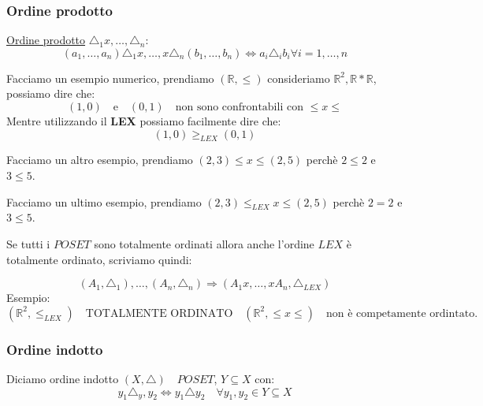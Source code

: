 \documentclass{article}
\begin{document}
\subsubsection{Ordine prodotto}
\underline{Ordine prodotto} $\triangle_1x,\ldots,\triangle_n$:
\begin{equation*}
        (a_1,\ldots,a_n) \triangle_1x,\ldots, x\triangle_n(b_1,\ldots,b_n) \Leftrightarrow a_i \triangle_i b_i \forall i = 1,\ldots,n
\end{equation*}

Facciamo un esempio numerico, prendiamo $(\mathbb{R}, \le)$ consideriamo $\mathbb{R}^2, \mathbb{R}*\mathbb{R}$, possiamo dire che:
\begin{equation*}
        (1, 0) \quad \mbox{e} \quad (0,1) \quad \mbox{non sono confrontabili con $\le x \le$}
\end{equation*}
Mentre utilizzando il \textbf{LEX} possiamo facilmente dire che:
\begin{equation*}
        (1, 0) \ge_{LEX} (0,1)
\end{equation*}

Facciamo un altro esempio, prendiamo $(2,3) \le x \le(2,5)$ perchè $2 \le 2$ e $3 \le 5$. \par
Facciamo un ultimo esempio, prendiamo $(2,3) \le_{LEX} x \le(2,5)$ perchè $2 = 2$ e $3 \le 5$. \newline

Se tutti i $POSET$ sono totalmente ordinati allora anche l'ordine $LEX$ è totalmente ordinato, scriviamo quindi:

\begin{equation*}
        (A_1,\triangle_1), \ldots, (A_n, \triangle_n) \Rightarrow (A_1x,\ldots,xA_n,\triangle_{LEX})
\end{equation*}
Esempio:
\begin{equation*}
        (\mathbb{R}^2, \le_{LEX}) \quad \mbox{TOTALMENTE ORDINATO} \quad (\mathbb{R}^2, \le x \le) \quad \mbox{non è competamente ordintato}. 
\end{equation*}


\subsubsection{Ordine indotto}
Diciamo ordine indotto $(X, \triangle) \quad POSET$, $ Y \subseteq X$ con:
\begin{equation*}
        y_1 \triangle_y,y_2 \Leftrightarrow y_1 \triangle y_2 \quad \forall y_1,y_2 \in Y \subseteq X
\end{equation*}
\end{document}
